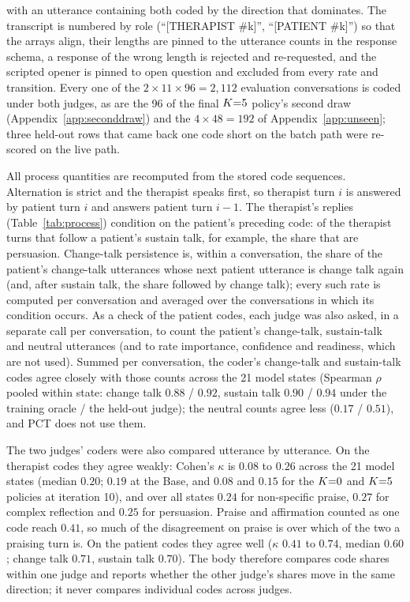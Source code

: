 with an utterance containing both coded by the direction that dominates. The transcript is
numbered by role (``[THERAPIST \#k]'', ``[PATIENT \#k]'') so that the arrays align, their
lengths are pinned to the utterance counts in the response schema, a response of the wrong length
is rejected and re-requested, and the scripted opener is pinned to open question and excluded
from every rate and transition. Every one of the $2 \times 11 \times 96 = 2{,}112$ evaluation
conversations is coded under both judges, as are the 96 of the final $K{=}5$ policy's second draw
(Appendix~\ref{app:seconddraw}) and the $4 \times 48 = 192$ of Appendix~\ref{app:unseen}; three held-out rows that came back one code short on
the batch path were re-scored on the live path.

All process quantities are recomputed from the stored code sequences. Alternation is strict and
the therapist speaks first, so therapist turn $i$ is answered by patient turn $i$ and answers
patient turn $i-1$. The therapist's replies (Table~\ref{tab:process}) condition on the patient's
preceding code: of the therapist turns that follow a patient's sustain talk, for example, the share
that are persuasion. Change-talk persistence is, within a conversation, the share of the patient's
change-talk utterances whose next patient utterance is change talk again (and, after sustain talk,
the share followed by change talk); every such rate is computed per conversation and averaged over
the conversations in which its condition occurs. As a check of the
patient codes, each judge was also asked, in a separate call per conversation, to count the
patient's change-talk, sustain-talk and neutral utterances (and to rate importance, confidence and
readiness, which are not used). Summed per conversation, the coder's change-talk and sustain-talk
codes agree closely with those counts across the 21 model states (Spearman $\rho$ pooled within
state: change talk $0.88$ / $0.92$, sustain talk $0.90$ / $0.94$ under the training oracle / the
held-out judge); the neutral counts agree less ($0.17$ / $0.51$), and PCT does not use them.

The two judges' coders were also compared utterance by utterance. On the therapist codes they agree
weakly: Cohen's $\kappa$ is $0.08$ to $0.26$ across the 21 model states (median
$0.20$; $0.19$ at the Base, and $0.08$ and $0.15$ for the $K{=}0$ and $K{=}5$ policies at iteration 10),
and over all states $0.24$ for non-specific praise, $0.27$ for complex reflection and $0.25$ for
persuasion. Praise and affirmation counted as one code reach $0.41$, so much of the disagreement on praise is
over which of the two a praising turn is. On the patient codes they agree well ($\kappa$ $0.41$ to
$0.74$, median $0.60$; change talk $0.71$, sustain talk $0.70$). The body therefore compares code
shares within one judge and reports whether the other judge's shares move in the same direction; it
never compares individual codes across judges.

